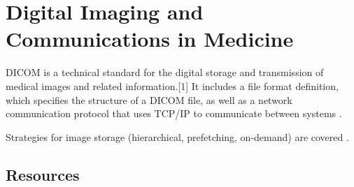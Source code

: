 \chapter{Digital Imaging and Communications in Medicine}

DICOM is a technical standard for the digital storage and transmission
of medical images and related information.[1] It includes a file
format definition, which specifies the structure of a DICOM file, as
well as a network communication protocol that uses TCP/IP to
communicate between systems \cite{wikipedia2025DICOM}.

Strategies for image storage (hierarchical, prefetching, on-demand)
are covered \cite{bushberg2011essential}.

\section{Resources}


